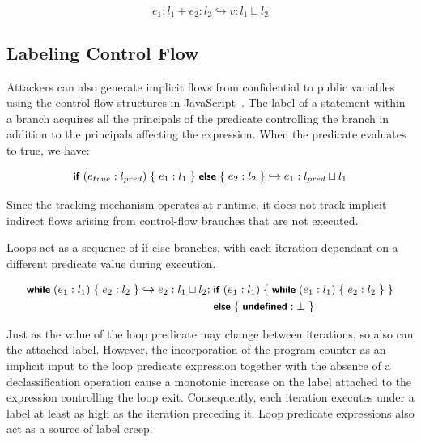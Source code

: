 \begin{equation}
\label{eqn:formal-addition}
  e_1:l_1 + e_2:l_2 \hookrightarrow v:l_1 \sqcup l_2
\end{equation}

\subsection{Labeling Control Flow}
\label{sec:formal-semantics}

Attackers can also generate implicit flows from confidential to public variables using the control-flow structures in JavaScript~\cite[p.~135]{guha.etal+10}.
The label of a statement within a branch acquires all the principals of the predicate controlling the branch in addition to the principals affecting the expression.
When the predicate evaluates to true, we have:

\newcommand{\kw}[1]{\text{\small\textsf{\textbf{#1}}}}

\begin{equation}
  \kw{if}\;(e_{true}:l_{pred})\;\{\;e_1:l_1\;\}\;\kw{else}\;\{\;e_2:l_2\;\} \hookrightarrow e_1:l_{pred} \sqcup l_1
\end{equation}

Since the tracking mechanism operates at runtime, it does not track implicit indirect flows arising from control-flow branches that are not executed.

Loops act as a sequence of if-else branches, with each iteration dependant on a different predicate value during execution.

\begin{equation}
\begin{split}
  \kw{while}\;(e_1:l_1)\;\{\;e_2:l_2\;\} \hookrightarrow
  e_2:l_1 \sqcup l_2 ;\; &\kw{if}\;(e_1:l_1)\;\{\;
  \kw{while}\;(e_1:l_1)\;\{\;e_2:l_2\;\}\;\}  \\
  &\kw{else}\;\{\;\kw{undefined}:\bot\;\}
\end{split}
\end{equation}

Just as the value of the loop predicate may change between iterations, so also can the attached label.
However, the incorporation of the program counter as an implicit input to the loop predicate expression together with the absence of a declassification operation cause a monotonic increase on the label attached to the expression controlling the loop exit.
Consequently, each iteration executes under a label at least as high as the iteration preceding it.
Loop predicate expressions also act as a source of label creep.


